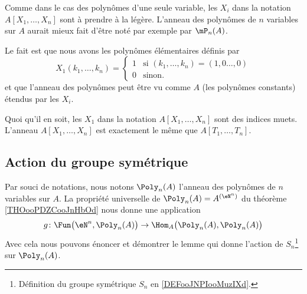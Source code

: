 \begin{normaltext}
    Comme dans le cas des polynômes d'une seule variable, les \( X_i\) dans la notation \( A[X_1,\ldots, X_n]\) sont à prendre à la légère. L'anneau des polynômes de \( n\) variables sur \( A\) aurait mieux fait d'être noté par exemple par \( \mP_n(A)\).

    Le fait est que nous avons les polynômes élémentaires définis par
    \begin{equation}
        X_1(k_1,\ldots, k_n)=\begin{cases}
            1    &   \text{si } (k_1,\ldots, k_n)=(1,0\ldots, 0)\\
            0    &    \text{sinon. }
        \end{cases}
    \end{equation}
    et que l'anneau des polynômes peut être vu comme \( A\) (les polynômes constants) étendus par les \( X_i\).

    Quoi qu'il en soit, les \( X_1\) dans la notation \( A[X_1,\ldots, X_n]\) sont des indices muets. L'anneau \( A[X_1,\ldots, X_n]\) est exactement le même que \( A[T_1,\ldots, T_n]\).
\end{normaltext}

\subsection{Action du groupe symétrique}

Par souci de notations, nous notons \( \Poly_n(A)\) l'anneau des polynômes de \( n\) variables sur \( A\). La propriété universelle de \( \Poly_n(A)=A^{(\eN^n)}\) du théorème \ref{THOooPDZCooJnHbOd} nous donne une application
\begin{equation}
    g\colon \Fun\big(\eN^n,\Poly_n(A)\big)\to \Hom_A\big( \Poly_n(A),\Poly_n(A) \big)
\end{equation}
Avec cela nous pouvons énoncer et démontrer le lemme qui donne l'action de \( S_n\)\footnote{Définition du groupe symétrique \( S_n\) en \ref{DEFooJNPIooMuzIXd}.} sur \( \Poly_n(A)\).

